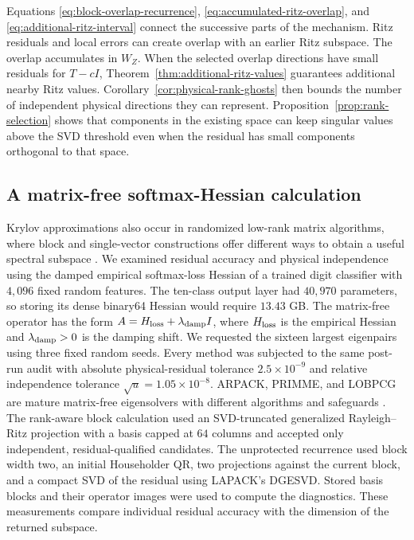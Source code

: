 \documentclass[11pt]{article}
\theoremstyle{definition}
\begin{document}
Equations \eqref{eq:block-overlap-recurrence},
\eqref{eq:accumulated-ritz-overlap}, and
\eqref{eq:additional-ritz-interval} connect the successive parts of the
mechanism.  Ritz residuals and local errors can create overlap with an
earlier Ritz subspace.  The overlap accumulates in $W_Z$.  When the selected
overlap directions have small residuals for $T-cI$,
Theorem~\ref{thm:additional-ritz-values} guarantees additional nearby Ritz
values.  Corollary~\ref{cor:physical-rank-ghosts} then bounds the number of
independent physical directions they can represent.
Proposition~\ref{prop:rank-selection} shows that
components in the existing space can keep singular values above the SVD
threshold even when the residual has small components orthogonal to that space.

\subsection{A matrix-free softmax-Hessian calculation}
\label{sec:hessian-experiment}

Krylov approximations also occur in randomized low-rank matrix algorithms,
where block and single-vector constructions offer different ways to obtain
a useful spectral subspace
\cite{MuscoMusco2015,MeyerMuscoMusco2024,TroppWebber2023}.
We examined residual accuracy and physical independence using the damped
empirical softmax-loss Hessian of a trained digit classifier with $4{,}096$
fixed random features.  The
ten-class output layer had $40{,}970$ parameters, so storing its
dense binary64 Hessian would require $13.43$ GB.  The matrix-free operator
has the form $A=H_{\rm loss}+\lambda_{\rm damp}I$, where $H_{\rm loss}$ is
the empirical Hessian and $\lambda_{\rm damp}>0$ is the damping shift.
We requested the sixteen
largest eigenpairs using three fixed random seeds.  Every method was
subjected to the same post-run audit with absolute physical-residual tolerance
$2.5\times10^{-9}$ and relative independence tolerance
$\sqrt{u}=1.05\times10^{-8}$.  ARPACK, PRIMME, and LOBPCG are mature
matrix-free eigensolvers with different algorithms and safeguards
\cite{ARPACKUsersGuide1998,Knyazev2001,StathopoulosMcCombs2010}.  The
rank-aware block calculation used an SVD-truncated generalized Rayleigh--Ritz
projection with a basis capped at $64$ columns and accepted only independent,
residual-qualified candidates.  The unprotected recurrence used block width
two, an initial Householder QR, two projections against the current block,
and a compact SVD of the residual using LAPACK's DGESVD.  Stored basis blocks
and their operator images were used to compute the diagnostics.  These measurements
compare individual residual accuracy with the dimension of the returned
subspace.
\end{document}
